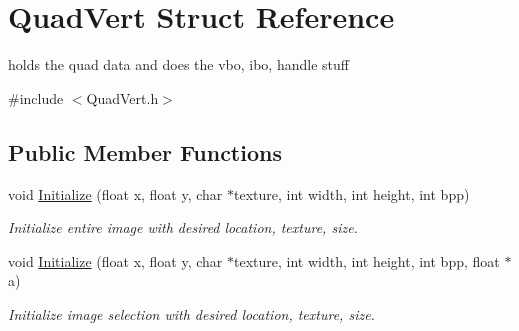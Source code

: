 \hypertarget{struct_quad_vert}{}\section{Quad\+Vert Struct Reference}
\label{struct_quad_vert}


holds the quad data and does the vbo, ibo, handle stuff  




{\ttfamily \#include $<$Quad\+Vert.\+h$>$}

\subsection*{Public Member Functions}
\begin{DoxyCompactItemize}
\item 
\hypertarget{struct_quad_vert_a0916a661e71114fd2269af13f2433f3e}{}void \hyperlink{struct_quad_vert_a0916a661e71114fd2269af13f2433f3e}{Initialize} (float x, float y, char $\ast$texture, int width, int height, int bpp)\label{struct_quad_vert_a0916a661e71114fd2269af13f2433f3e}

\begin{DoxyCompactList}\small\item\em Initialize entire image with desired location, texture, size. \end{DoxyCompactList}\item 
\hypertarget{struct_quad_vert_a7a522a96e0ec4ba4189902466f6b0457}{}void \hyperlink{struct_quad_vert_a7a522a96e0ec4ba4189902466f6b0457}{Initialize} (float x, float y, char $\ast$texture, int width, int height, int bpp, float $\ast$a)\label{struct_quad_vert_a7a522a96e0ec4ba4189902466f6b0457}

\begin{DoxyCompactList}\small\item\em Initialize image selection with desired location, texture, size. \end{DoxyCompactList}\end{DoxyCompactItemize}
